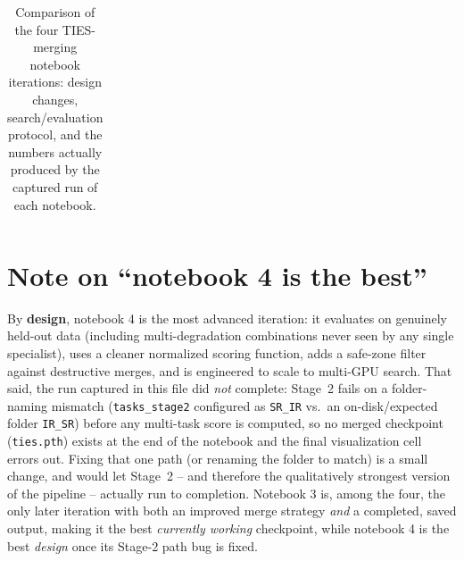 \documentclass[11pt]{article}
\begin{document}
\begin{table}[htbp]
\begin{tabular}{@{}p{1.7cm}p{4.3cm}p{4.3cm}p{4.9cm}@{}}
\bottomrule
\end{tabular}
\caption{Comparison of the four TIES-merging notebook iterations: design changes, search/evaluation protocol, and the numbers actually produced by the captured run of each notebook.}
\end{table}

\section{Note on ``notebook 4 is the best''}

By \textbf{design}, notebook 4 is the most advanced iteration: it evaluates on
genuinely held-out data (including multi-degradation combinations never seen
by any single specialist), uses a cleaner normalized scoring function, adds a
safe-zone filter against destructive merges, and is engineered to scale to
multi-GPU search. That said, the run captured in this file did \emph{not}
complete: Stage~2 fails on a folder-naming mismatch
(\texttt{tasks\_stage2} configured as \texttt{SR\_IR} vs.\ an on-disk/expected
folder \texttt{IR\_SR}) before any multi-task score is computed, so no merged
checkpoint (\texttt{ties.pth}) exists at the end of the notebook and the final
visualization cell errors out. Fixing that one path (or renaming the folder to
match) is a small change, and would let Stage~2 -- and therefore the
qualitatively strongest version of the pipeline -- actually run to completion.
Notebook 3 is, among the four, the only later iteration with both an improved
merge strategy \emph{and} a completed, saved output, making it the best
\emph{currently working} checkpoint, while notebook 4 is the best \emph{design}
once its Stage-2 path bug is fixed.
\end{document}
